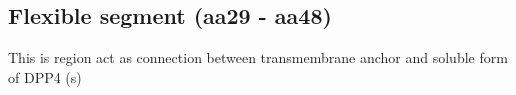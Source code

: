 \subsection{Flexible segment (aa29 - aa48)}

This is region act as connection between transmembrane anchor and soluble form of DPP4 (s)
